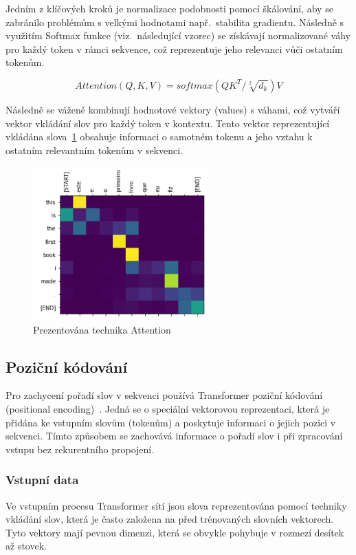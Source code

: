 Jedním z klíčových kroků je normalizace podobnosti pomocí škálování, aby se zabránilo problémům s velkými hodnotami např.\ stabilita gradientu.
Následně s využitím Softmax funkce (viz.~následující vzorec) se získávají normalizované váhy pro každý token v rámci sekvence, což reprezentuje jeho relevanci vůči ostatním tokenům.

\[Attention(Q, K, V) = softmax(QK^{T}/\sqrt[2]{d_{k}}) V\]

Následně se váženě kombinují hodnotové vektory (values) s váhami, což vytváří vektor vkládání slov pro každý token v kontextu.
Tento vektor reprezentující vkládána slova~\ref{fig:Vypocet Attention pro sekvenci} obsahuje informaci o samotném tokenu a jeho vztahu k ostatním relevantním tokenům v sekvenci.

\begin{figure}[H]
	\centering
	\includegraphics[width=0.6\textwidth]{Figures/attention_example.png}
	\caption{Prezentována technika Attention~\cite{link25}}\label{fig:Vypocet Attention pro sekvenci}
\end{figure}

\subsection{Poziční kódování}
Pro zachycení pořadí slov v sekvenci používá Transformer poziční kódování (positional encoding)~\cite{link38}.
Jedná se o speciální vektorovou reprezentaci, která je přidána ke vstupním slovům (tokenům) a poskytuje informaci o jejich pozici v sekvenci.
Tímto způsobem se zachovává informace o pořadí slov i při zpracování vstupu bez rekurentního propojení.

\subsubsection{Vstupní data}
Ve vstupním procesu Transformer sítí jsou slova reprezentována pomocí techniky vkládání slov, která je často založena na před trénovaných slovních vektorech.
Tyto vektory mají pevnou dimenzi, která se obvykle pohybuje v rozmezí desítek až stovek.

